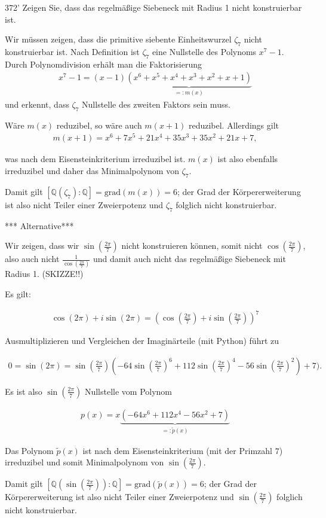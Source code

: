 \begin{algebraUE}{372'}
Zeigen Sie, dass das regelmäßige Siebeneck mit Radius 1 nicht konstruierbar ist.
\end{algebraUE}

\begin{solution}
  Wir müssen zeigen, dass die primitive siebente Einheitswurzel $\zeta_7$ nicht konstruierbar ist. Nach Definition ist $\zeta_7$ eine Nullstelle des Polynoms $x^7-1.$ Durch Polynomdivision erhält man die Faktorisierung
  \begin{align}
      x^7-1 = (x-1)\underbrace{(x^6+x^5+x^4+x^3+x^2+x+1)}_{=: m(x)}
  \end{align}
  und erkennt, dass $\zeta_7$ Nullstelle des zweiten Faktors sein muss.

  Wäre $m(x)$ reduzibel, so wäre auch $m(x+1)$ reduzibel. Allerdings gilt
  \begin{align}
      m(x+1) = x^6+7x^5+21x^4+35x^3+35x^2+21x+7,
  \end{align}

  was nach dem Eisensteinkriterium irreduzibel ist. $m(x)$ ist also ebenfalls irreduzibel und daher das Minimalpolynom von $\zeta_7.$

  Damit gilt $[\mathbb{Q}(\zeta_7):\mathbb{Q}] = \mathrm{grad}(m(x)) = 6$; der Grad der Körpererweiterung ist also nicht Teiler einer Zweierpotenz und $\zeta_7$ folglich nicht konstruierbar.


  *** Alternative***

  Wir zeigen, dass wir $\sin(\frac{2 \pi }{7})$ nicht konstruieren können, somit nicht $\cos(\frac{2 \pi }{7})$, also auch nicht $\frac{1}{\cos(\frac{2 \pi }{7})}$ und damit auch nicht das regelmäßige Siebeneck mit Radius 1. (SKIZZE!!)

  Es gilt:

  \begin{align*}
    \cos(2 \pi) + i \sin(2 \pi) = (\cos(\frac{2 \pi }{7}) + i \sin(\frac{2 \pi }{7}))^{7}
  \end{align*}

  Ausmultiplizieren und Vergleichen der Imaginärteile (mit Python) führt zu

  \begin{align*}
    0 = \sin(2 \pi) = \sin(\frac{2 \pi }{7}) (-64 \sin(\frac{2 \pi }{7})^{6} + 112 \sin(\frac{2 \pi }{7})^4 - 56 \sin(\frac{2 \pi }{7})^2) + 7).
  \end{align*}

  Es ist also $\sin(\frac{2 \pi }{7})$ Nullstelle vom Polynom

  \begin{align*}
    p(x) = x\underbrace{(-64x^6 + 112x^4 - 56x^2 + 7)}_{=:\tilde{p}(x)}
  \end{align*}

  Das Polynom $\tilde{p}(x)$ ist nach dem Eisensteinkriterium (mit der Primzahl $7$) irreduzibel und somit Minimalpolynom von $\sin(\frac{2 \pi }{7})$.

  Damit gilt $[\mathbb{Q}(\sin(\frac{2 \pi }{7})):\mathbb{Q}] = \mathrm{grad}(\tilde{p}(x)) = 6$; der Grad der Körpererweiterung ist also nicht Teiler einer Zweierpotenz und $\sin(\frac{2 \pi }{7})$ folglich nicht konstruierbar.

\end{solution}
